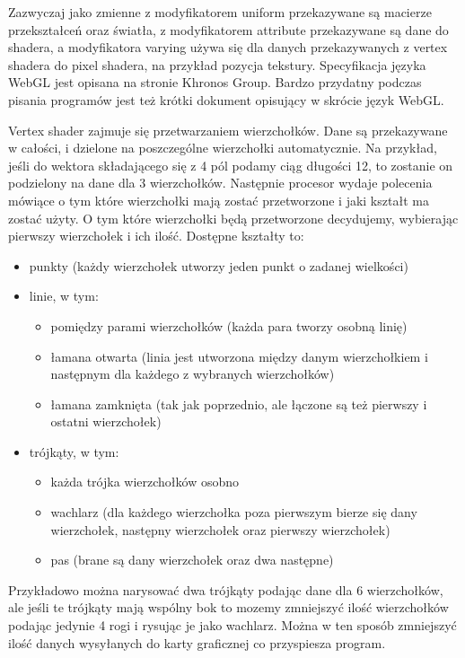 Zazwyczaj jako zmienne z modyfikatorem uniform przekazywane są macierze przekształceń oraz \'swiatła, z modyfikatorem attribute przekazywane są dane do shadera, a modyfikatora varying używa się dla danych przekazywanych z vertex shadera do pixel shadera, na przykład pozycja tekstury. 
Specyfikacja języka WebGL jest opisana na stronie Khronos Group\cite{WebGLSpecification}. Bardzo przydatny podczas pisania programów jest też krótki dokument opisujący w skrócie język WebGL\cite{WebGLReferenceCard}.\newpage

\smallskip

Vertex shader zajmuje się przetwarzaniem wierzchołków. Dane są przekazywane w całości, i dzielone na poszczególne wierzchołki automatycznie. Na przykład, je\'sli do wektora składającego się z 4 pól podamy ciąg długości 12, to zostanie on podzielony na dane dla 3 wierzchołków.
Następnie procesor wydaje polecenia mówiące o tym które wierzchołki mają zostać przetworzone i jaki kształt ma zostać użyty. O tym które wierzchołki będą przetworzone decydujemy, wybierając pierwszy wierzchołek i ich ilo\'sć.
Dostępne kształty to:\begin{itemize}[topsep=0.2em, itemsep=0.5em, partopsep=0em, parsep=0em]
	\item punkty (każdy wierzchołek utworzy jeden punkt o zadanej wielko\'sci)
	\item linie, w tym:\begin{itemize}[topsep=0.2em, itemsep=0.5em, partopsep=0em, parsep=0em]
		\item pomiędzy parami wierzchołków (każda para tworzy osobną linię)
		\item łamana otwarta (linia jest utworzona między danym wierzchołkiem i następnym dla każdego z wybranych wierzchołków)
		\item łamana zamknięta (tak jak poprzednio, ale łączone są też pierwszy i ostatni wierzchołek)
	\end{itemize}
	\item trójkąty, w tym:\begin{itemize}[topsep=0.2em, itemsep=0.5em, partopsep=0em, parsep=0em]
		\item każda trójka wierzchołków osobno
		\item wachlarz (dla każdego wierzchołka poza pierwszym bierze się dany wierzchołek, następny wierzchołek oraz pierwszy wierzchołek)
		\item pas (brane są dany wierzchołek oraz dwa następne)
	\end{itemize}
\end{itemize}
Przykładowo można narysować dwa trójkąty podając dane dla 6 wierzchołków, ale jeśli te trójkąty mają wspólny bok to mozemy zmniejszyć ilość wierzchołków podając jedynie 4 rogi i rysując je jako wachlarz. Można w ten sposób zmniejszyć ilość danych wysyłanych do karty graficznej co przyspiesza program.

